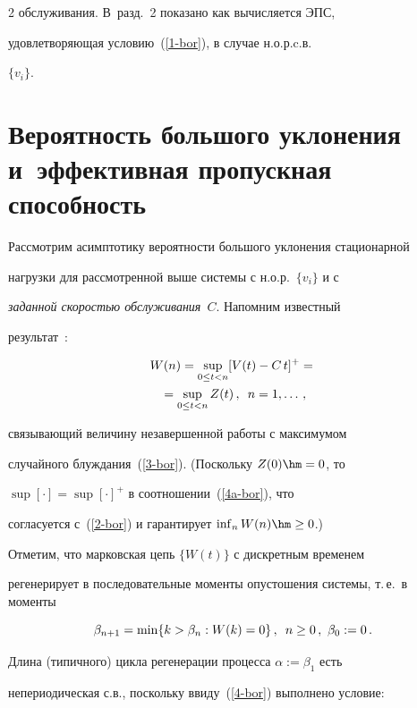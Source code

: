 \begin{multicols}{2}
обслуживания. В~разд.~2 показано как вычисляется  ЭПС,

удовлетворяющая условию~(\ref{1-bor}), в случае н.о.р.c.в.\

$\{v_i\}$.



\section{Вероятность большого уклонения и~эффективная пропускная способность}



Рассмотрим  асимптотику вероятности большого уклонения стационарной

нагрузки для рас\-смот\-рен\-ной выше системы с н.о.р.\ $\{v_i\}$ и с

{\it заданной скоростью обслуживания}~$C$. Напомним известный

результат~\cite{Asmus}:

\begin{multline}

W(n)=


\sup\limits_{0\le t< n}[V(t)-C\,t]^+={}\\

{}=\sup\limits_{0\le t<n}Z(t)\,,\enskip

n=1,\ldots\,,

\label{4a-bor}

\end{multline}

связывающий  величину незавершенной работы с максимумом

 случайного блуждания~(\ref{3-bor}).  (Поскольку $Z(0)\hm=0$, то

$\sup[\cdot]=\sup[\cdot]^+$ в  соотношении~(\ref{4a-bor}), что

согласуется с~(\ref{2-bor}) и гарантирует $\inf_nW(n)\hm\ge 0$.)

 Отметим, что марковская цепь $\{W(t)\}$ с дискретным временем

регенерирует в последовательные моменты  опустошения системы, т.\,е.\ в моменты

$$

\beta_{n+1}=\min\{k>\beta_n: W(k)=0\}\,,\enskip n\ge 0\,,\ \beta_0:=0\,.

$$

Длина (типичного) цикла регенерации процесса $\alpha:=\beta_1$ есть

непериодическая с.в., поскольку ввиду~(\ref{4-bor}) выполнено условие:


\end{multicols}

